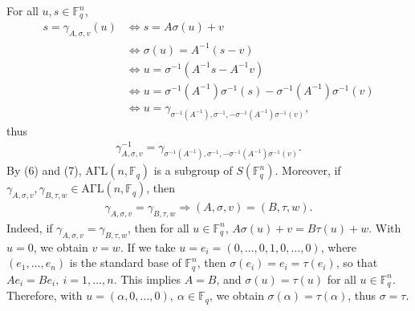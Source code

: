 \documentclass[11pt,a4paper]{article}
\newcommand{\F}{\mathbb{F}}
\begin{document}
For all $u,s \in \F_q^n$,
\begin{align*}
s = \gamma_{A,\sigma,v}(u) &\iff s = A \sigma(u) + v\\
&\iff \sigma(u) = A^{-1}(s -v)\\
&\iff u = \sigma^{-1}(A^{-1} s - A^{-1}v)\\
&\iff u = \sigma^{-1}(A^{-1}) \sigma^{-1}(s) - \sigma^{-1}(A^{-1})\sigma^{-1}(v)\\
&\iff u = \gamma_{\sigma^{-1}(A^{-1}),\sigma^{-1},- \sigma^{-1}(A^{-1})\sigma^{-1}(v)},
\end{align*}
thus
\begin{align}
\gamma_{A,\sigma,v}^{-1} = \gamma_{\sigma^{-1}(A^{-1}),\sigma^{-1},- \sigma^{-1}(A^{-1})\sigma^{-1}(v)}.
\end{align}
By (6) and (7), $\mathrm{A\Gamma L}(n,\F_q)$ is a subgroup of $S(\F_q^n)$.
Moreover, if $\gamma_{A,\sigma,v}, \gamma_{B,\tau,w} \in  \mathrm{A\Gamma L}(n,\F_q)$, then
\begin{align}
 \gamma_{A,\sigma,v} =  \gamma_{B,\tau,w} \Rightarrow (A,\sigma,v) = (B,\tau,w).
\end{align}
 Indeed, if $\gamma_{A,\sigma,v} =  \gamma_{B,\tau,w}$, then for all $u \in \F_q^n$, $A \sigma(u) + v = B \tau(u) + w$. With $u=0$, we obtain $v = w$. If we take $u =e_i =(0,\ldots,0,1,0,\ldots,0)$, where $(e_1,\ldots,e_n)$ is the standard base of $\F_q^n$, then $\sigma(e_i) = e_i = \tau(e_i)$, so that $Ae_i = Be_i,\ i=1,\ldots,n$. This implies $A = B$, and $\sigma(u) = \tau(u)$ for all $u\in \F_q^n$. Therefore, with $u = (\alpha,0,\ldots,0),\ \alpha \in \F_q$, we obtain $\sigma(\alpha) = \tau(\alpha)$, thus $\sigma = \tau$.
\end{document}
